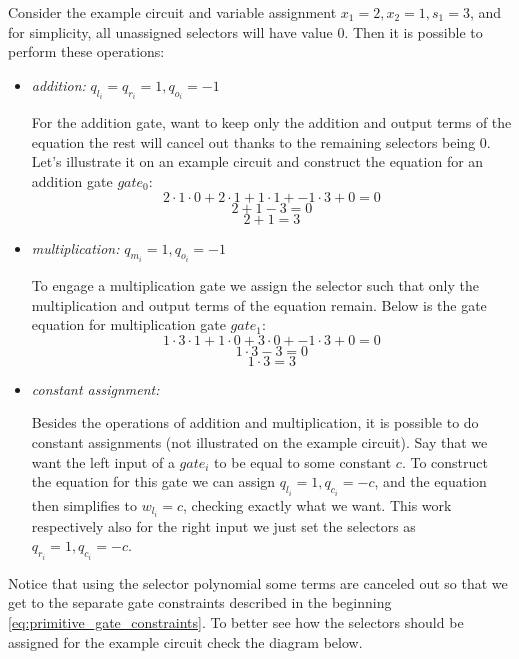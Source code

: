 Consider the example circuit and variable assignment $x_1 = 2, x_2 = 1, s_1 = 3$, and for simplicity, all unassigned selectors will have value 0. Then it is possible to perform these operations:


\begin{itemize}
    \item \textit{addition:} $q_{l_i} = q_{r_i} = 1, q_{o_i} = -1$
        
        For the addition gate, want to keep only the addition and output terms of the equation the rest will cancel out thanks to the remaining selectors being 0. Let's illustrate it on an example circuit and construct the equation for an addition gate $gate_0$:
        $$2\cdot 1 \cdot 0 + 2 \cdot 1 + 1 \cdot 1 + -1 \cdot 3 + 0 = 0$$
        $$2 + 1  -3 = 0$$
        $$2 + 1 = 3$$
    \item \textit{multiplication:} $q_{m_i} = 1, q_{o_i} = -1$

        To engage a multiplication gate we assign the selector such that only the multiplication and output terms of the equation remain. Below is the gate equation for multiplication gate $gate_1$:
        $$1 \cdot 3 \cdot 1 + 1 \cdot 0 + 3 \cdot 0 + -1 \cdot 3 + 0 = 0$$
        $$1 \cdot 3 -3 = 0$$
        $$1 \cdot 3 = 3$$
    \item \textit{constant assignment:}
        
        Besides the operations of addition and multiplication, it is possible to do constant assignments (not illustrated on the example circuit). Say that we want the left input of a $gate_i$ to be equal to some constant $c$. To construct the equation for this gate we can assign $q_{l_i} = 1, q_{c_i} = -c$, and the equation then simplifies to $w_{l_i} = c$, checking exactly what we want. This work respectively also for the right input we just set the selectors as $q_{r_i} = 1, q_{c_i} = -c$.
\end{itemize}


Notice that using the selector polynomial some terms are canceled out so that we get to the separate gate constraints described in the beginning \eqref{eq:primitive_gate_constraints}. To better see how the selectors should be assigned for the example circuit check the diagram below.

